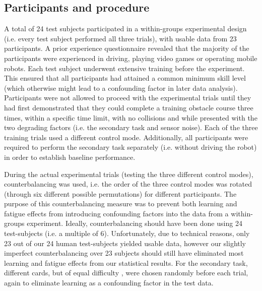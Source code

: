 \documentclass[a4paper,12pt,oneside,openright]{bhamthesis}
\begin{document}
\subsection{Participants and procedure}
A total of 24 test subjects participated in a within-groups experimental design (i.e. every test subject performed all three trials), with usable data from 23 participants. A prior experience questionnaire revealed that the majority of the participants were experienced in driving, playing video games or operating mobile robots. Each test subject underwent extensive training before the experiment. This ensured that all participants had attained a common minimum skill level (which otherwise might lead to a confounding factor in later data analysis). Participants were not allowed to proceed with the experimental trials until they had first demonstrated that they could complete a training obstacle course three times, within a specific time limit, with no collisions and while presented with the two degrading factors (i.e. the secondary task and sensor noise). Each of the three training trials used a different control mode. Additionally, all participants were required to perform the secondary task separately (i.e. without driving the robot) in order to establish baseline performance.

During the actual experimental trials (testing the three different control modes), counterbalancing was used, i.e. the order of the three control modes was rotated (through six different possible permutations) for different participants. The purpose of this counterbalancing measure was to prevent both learning and fatigue effects from introducing confounding factors into the data from a within-groups experiment. Ideally, counterbalancing should have been done using 24 test-subjects (i.e. a multiple of 6). Unfortunately, due to technical reasons, only 23 out of our 24 human test-subjects yielded usable data, however our slightly imperfect counterbalancing over 23 subjects should still have eliminated most learning and fatigue effects from our statistical results. For the secondary task, different cards, but of equal difficulty \cite{Ganis2015}, were chosen randomly before each trial, again to eliminate learning as a confounding factor in the test data. 
\end{document}
